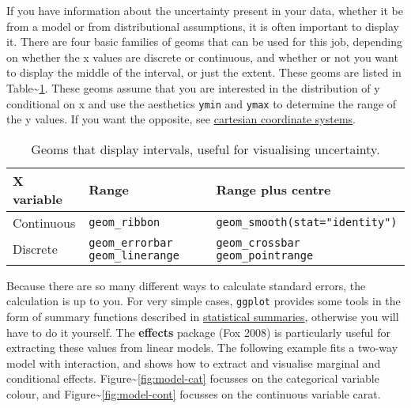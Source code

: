 If you have information about the uncertainty present in your data,
whether it be from a model or from distributional assumptions, it is
often important to display it. There are four basic families of geoms
that can be used for this job, depending on whether the x values are
discrete or continuous, and whether or not you want to display the
middle of the interval, or just the extent. These geoms are listed in
Table\textasciitilde{}\ref{tbl:interval}. These geoms assume that you
are interested in the distribution of y conditional on x and use the
aesthetics \texttt{ymin} and \texttt{ymax} to determine the range of the
y values. If you want the opposite, see
\hyperref[sub:cartesian]{cartesian coordinate systems}.
  
  
  

\begin{table}
  \centering
  \begin{tabular}{lp{1.3in}p{2.2in}}
    \toprule
    X variable & Range & Range plus centre \\
    \midrule
    Continuous & \texttt{geom_ribbon} & \texttt{geom_smooth(stat="identity")} \\
    Discrete   & \texttt{geom_errorbar} \newline \texttt{geom_linerange} & \texttt{geom_crossbar} \newline \texttt{geom_pointrange}  \\
    \bottomrule
    
  \end{tabular}
  \caption{Geoms that display intervals, useful for visualising uncertainty.}
  \label{tbl:interval}
\end{table}

Because there are so many different ways to calculate standard errors,
the calculation is up to you.  For very simple
cases, \texttt{ggplot} provides some tools in the form of summary
functions described in \hyperref[sec:summary]{statistical summaries},
otherwise you will have to do it yourself. The \textbf{effects} package
(Fox 2008) is particularly useful for extracting these values from
linear models. The following example fits a two-way model with
interaction, and shows how to extract and visualise marginal and
conditional effects. Figure\textasciitilde{}\ref{fig:model-cat} focusses
on the categorical variable colour, and
Figure\textasciitilde{}\ref{fig:model-cont} focusses on the continuous
variable carat. 

